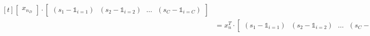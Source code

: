 \documentclass{article}
\begin{document}
\begin{subequations}
\begin{equation}
\begin{aligned}[t]
\begin{bmatrix}
                x_{n_{D}}
            \end{bmatrix} \cdot
            \begin{bmatrix}
                (s_{1} - \mathds{1}_{i=1}) \ \ \ (s_{2} - \mathds{1}_{i=2}) \ \ \ \dots \ \ \ (s_{C} - \mathds{1}_{i=C})
            \end{bmatrix}\\
            &=
            x_{n}^{T} \cdot 
            \begin{bmatrix}
                (s_{1} - \mathds{1}_{i=1}) \ \ \ (s_{2} - \mathds{1}_{i=2}) \ \ \ \dots \ \ \ (s_{C} - \mathds{1}_{i=C})
            \end{bmatrix}\\
        \end{aligned}
    \end{equation}
    \begin{equation}
        \text{For all datapoints $\boldsymbol{X} \in \mathds{R}^{NxD}$ , we have } \frac{\partial L}{\partial \boldsymbol{W}} \in \mathds{R}^{DxC} \text{; Shape makes sense (think about it)}
    \end{equation}
    \begin{equation}
        \begin{aligned}[t]
            \frac{\partial L}{\partial \boldsymbol{W}} &= \frac{1}{N} \sum\limits_{i}\frac{\partial L_{i}}{\partial \boldsymbol{W}} \\&=
            \begin{bmatrix}
                x_{1_{1}}\\
                x_{1_{2}}\\
                \dots\\
                x_{1_{D}}
            \end{bmatrix} \cdot
            \begin{bmatrix}
                (s_{1} - \mathds{1}_{i=1})_{1} \ (s_{2} - \mathds{1}_{i=2})_{2} \ \dots \ (s_{C} - \mathds{1}_{i=C})_{N}
            \end{bmatrix} +
            \begin{bmatrix}
                x_{2_{1}}\\
                x_{2_{2}}\\
                \dots\\
                x_{2_{D}}
            \end{bmatrix} \cdot
            \begin{bmatrix}
                (s_{1} - \mathds{1}_{i=1})_{2} \ (s_{2} - \mathds{1}_{i=2})_{2} \ \dots \ (s_{C} - \mathds{1}_{i=C})_{2}

\end{bmatrix}
\end{aligned}
\end{equation}
\end{subequations}
\end{document}
